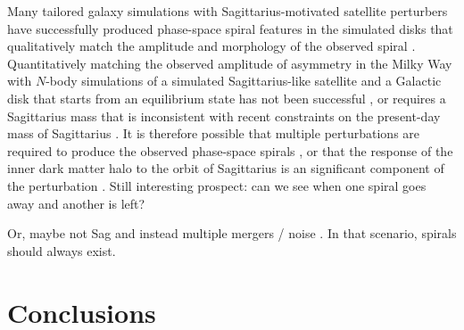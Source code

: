 Many tailored galaxy simulations with Sagittarius-motivated satellite perturbers have successfully produced phase-space spiral features in the simulated disks that qualitatively match the amplitude and morphology of the observed spiral \citep{Khanna:2019, Laporte:2019, Bland-Hawthorn:2021, Hunt:2021, Gandhi:2022}.
Quantitatively matching the observed amplitude of asymmetry in the Milky Way with $N$-body simulations of a simulated Sagittarius-like satellite and a Galactic disk that starts from an equilibrium state has not been successful \citep{Bennett:2022}, or requires a Sagittarius mass that is inconsistent with recent constraints on the present-day mass of Sagittarius \citep{Vasiliev:XX}.
It is therefore possible that multiple perturbations are required to produce the observed phase-space spirals \citep[e.g.,][]{Garcia-Conde:2022}, or that the response of the inner dark matter halo to the orbit of Sagittarius is an significant component of the perturbation \citep{Grand:2022}.
Still interesting prospect: can we see when one spiral goes away and another is left?

Or, maybe not Sag and instead multiple mergers / noise \citep{Tremaine:2022}.
In that scenario, spirals should always exist.


\section{Conclusions} \label{sec:conclusions}


